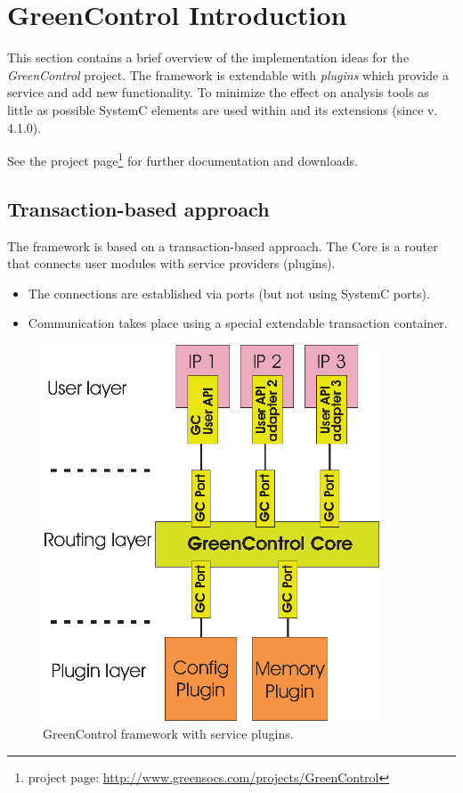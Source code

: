 
\chapter{GreenControl Introduction}

This section contains a brief overview of the implementation ideas for the {\em GreenControl} project. The \GreenControl framework is extendable with \textsl{plugins} which provide a service and add new functionality. To minimize the effect on analysis tools as little as possible SystemC elements are used within \GreenControl and its extensions (since v. 4.1.0).

See the project page\footnote{\GreenControl project page:  \href{http://www.greensocs.com/projects/GreenControl}{http://www.greensocs.com/projects/GreenControl}} for further documentation and downloads.

\section{Transaction-based approach}

The \GreenControl framework is based on a transaction-based approach. The \GreenControl Core is a router that connects user modules with service providers (plugins).
\begin{itemize}
	\item The connections are established via ports (but not using SystemC ports).
	\item Communication takes place using a special extendable transaction container.
\end{itemize}


\begin{figure}[htbp]
	\centerline{
		\includegraphics[width=10cm]{GreenControl.eps}} 
	\caption{GreenControl framework with service plugins.}
	\label{fig:GreenControl}
\end{figure}

